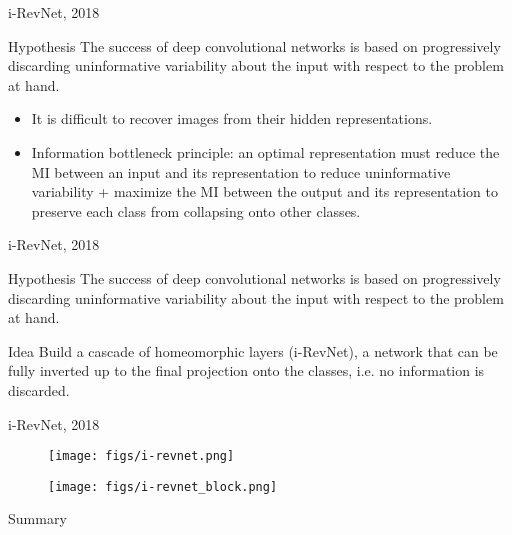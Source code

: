 \begin{frame}{i-RevNet, 2018}
	\begin{block}{Hypothesis}
		The success of deep convolutional networks is based on progressively discarding uninformative variability about the input with respect to the problem at hand. 
	\end{block}
	\begin{itemize}
		\item It is difficult to recover images from their hidden representations. 
		\item Information bottleneck principle: an optimal representation must reduce the MI between an input and its representation to reduce uninformative variability + maximize the MI between the output and its representation to preserve each class from collapsing onto other classes.
	\end{itemize}
\end{frame}
\begin{frame}{i-RevNet, 2018}
	\begin{block}{Hypothesis}
		The success of deep convolutional networks is based on progressively discarding uninformative variability about the input with respect to the problem at hand. 
	\end{block}
	
	\begin{block}{Idea}
		Build a cascade of homeomorphic layers (i-RevNet), a network that can be fully inverted up to the final projection onto the classes, i.e. no information is discarded.
	\end{block}
\end{frame}
\begin{frame}{i-RevNet, 2018}
	
	\begin{figure}
		\centering
		\texttt{[image: figs/i-revnet.png]}
	\end{figure}
	
	\begin{figure}
		\centering
		\texttt{[image: figs/i-revnet\_block.png]}
	\end{figure}

\end{frame}
\begin{frame}{Summary}
\end{frame}
 